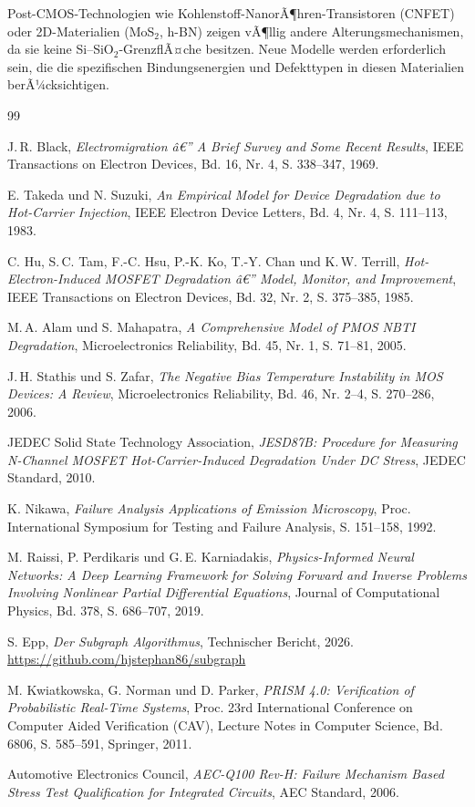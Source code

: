 ﻿\documentclass[a4paper,12pt]{article}
\theoremstyle{definition}
\begin{document}
Post-CMOS-Technologien wie Kohlenstoff-NanorÃ¶hren-Transistoren (CNFET) oder
2D-Materialien (MoS$_2$, h-BN) zeigen vÃ¶llig andere Alterungsmechanismen,
da sie keine Si--SiO$_2$-GrenzflÃ¤che besitzen. Neue Modelle werden erforderlich
sein, die die spezifischen Bindungsenergien und Defekttypen in diesen Materialien
berÃ¼cksichtigen.

\begin{thebibliography}{99}

J.\,R. Black,
\emph{Electromigration â€” A Brief Survey and Some Recent Results},
IEEE Transactions on Electron Devices, Bd. 16, Nr. 4, S. 338--347, 1969.

E. Takeda und N. Suzuki,
\emph{An Empirical Model for Device Degradation due to Hot-Carrier Injection},
IEEE Electron Device Letters, Bd. 4, Nr. 4, S. 111--113, 1983.

C. Hu, S.\,C. Tam, F.-C. Hsu, P.-K. Ko, T.-Y. Chan und K.\,W. Terrill,
\emph{Hot-Electron-Induced MOSFET Degradation â€” Model, Monitor, and Improvement},
IEEE Transactions on Electron Devices, Bd. 32, Nr. 2, S. 375--385, 1985.

M.\,A. Alam und S. Mahapatra,
\emph{A Comprehensive Model of PMOS NBTI Degradation},
Microelectronics Reliability, Bd. 45, Nr. 1, S. 71--81, 2005.

J.\,H. Stathis und S. Zafar,
\emph{The Negative Bias Temperature Instability in MOS Devices: A Review},
Microelectronics Reliability, Bd. 46, Nr. 2--4, S. 270--286, 2006.

JEDEC Solid State Technology Association,
\emph{JESD87B: Procedure for Measuring N-Channel MOSFET Hot-Carrier-Induced
Degradation Under DC Stress},
JEDEC Standard, 2010.

K. Nikawa,
\emph{Failure Analysis Applications of Emission Microscopy},
Proc. International Symposium for Testing and Failure Analysis, S. 151--158, 1992.

M. Raissi, P. Perdikaris und G.\,E. Karniadakis,
\emph{Physics-Informed Neural Networks: A Deep Learning Framework for Solving
Forward and Inverse Problems Involving Nonlinear Partial Differential Equations},
Journal of Computational Physics, Bd. 378, S. 686--707, 2019.

S. Epp,
\emph{Der Subgraph Algorithmus},
Technischer Bericht, 2026.
\url{https://github.com/hjstephan86/subgraph}

M. Kwiatkowska, G. Norman und D. Parker,
\emph{PRISM 4.0: Verification of Probabilistic Real-Time Systems},
Proc. 23rd International Conference on Computer Aided Verification (CAV),
Lecture Notes in Computer Science, Bd. 6806, S. 585--591, Springer, 2011.

Automotive Electronics Council,
\emph{AEC-Q100 Rev-H: Failure Mechanism Based Stress Test Qualification
for Integrated Circuits},
AEC Standard, 2006.

\end{thebibliography}
\end{document}
